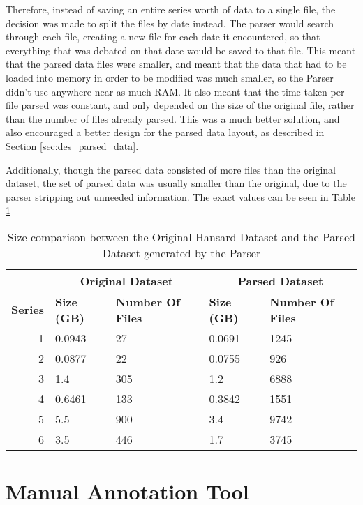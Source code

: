 Therefore, instead of saving an entire series worth of data to a single file, the decision was made to split the files by date instead. The parser would search through each file, creating a new file for each date it encountered, so that everything that was debated on that date would be saved to that file. This meant that the parsed data files were smaller, and meant that the data that had to be loaded into memory in order to be modified was much smaller, so the Parser didn't use anywhere near as much RAM. It also meant that the time taken per file parsed was constant, and only depended on the size of the original file, rather than the number of files already parsed. This was a much better solution, and also encouraged a better design for the parsed data layout, as described in Section \ref{sec:des_parsed_data}.

Additionally, though the parsed data consisted of more files than the original dataset, the set of parsed data was usually smaller than the original, due to the parser stripping out unneeded information. The exact values can be seen in Table \ref{tbl:parsed_data_size_comp}

\begin{table}[ht!]
\centering
\begin{tabular}{r || l | l || l | l}
	& \multicolumn{2}{|c||}{\textbf{Original Dataset}} & \multicolumn{2}{|c}{\textbf{Parsed Dataset}}\\
	\hline
	\textbf{Series} & \textbf{Size (GB)} & \textbf{Number Of Files} & \textbf{Size (GB)} & \textbf{Number Of Files}\\
	\hline
	\hline
	1 & 0.0943 & 27   & 0.0691 & 1245\\
	2 & 0.0877 & 22   & 0.0755 & 926\\
	3 & 1.4    & 305  & 1.2    & 6888\\
	4 & 0.6461 & 133  & 0.3842 & 1551\\
	5 & 5.5    & 900  & 3.4    & 9742\\
	6 & 3.5    & 446  & 1.7    & 3745\\
\end{tabular}
\caption{Size comparison between the Original Hansard Dataset and the Parsed Dataset generated by the Parser}
\label{tbl:parsed_data_size_comp}
\end{table}

\section{Manual Annotation Tool}
\label{sec:imp_manual_annotate}

